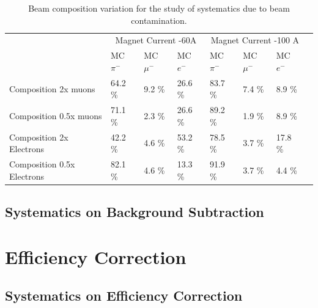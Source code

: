 \begin{table}[p]
\centering
\begin{tabular}{| l | l | l | l | l | l | l | l | }
\hline
 &  \multicolumn{3}{|c|}{Magnet Current -60A} & \multicolumn{3}{|c|}{Magnet Current -100 A}\\

                                                  & MC $\pi^-$   & MC  $ \mu^-$ & MC  $e^-$ & MC  $\pi^-$ & MC  $\mu^-$ & MC  $e^-$  \\
\hline
Composition 2x muons          & 64.2	\%&9.2 \%&	26.6 \%&	83.7 \%&	7.4	\%&8.9 \% \\
Composition 0.5x muons       &71.1	\%&2.3 \%&	26.6 \%&	89.2 \%&	1.9	\%&8.9 \% \\
Composition 2x Electrons      &42.2	\%&4.6 \%&	53.2 \%&	78.5	\%&  3.7	\%&17.8 \%\\
Composition 0.5x Electrons   &82.1	\%&4.6 \%&	13.3 \%&	91.9 \%&	3.7	\%&4.4 \% \\
\hline
\end{tabular}
\caption{Beam composition variation for the study of systematics due to beam contamination.}
\label{tab:beamlineSys}
\end{table}





\subsection{Systematics on Background Subtraction}\label{sec:beamSys}



\section{Efficiency Correction}\label{sec:EffCorrection}
\subsection{Systematics on Efficiency Correction}\label{sec:angSys}


